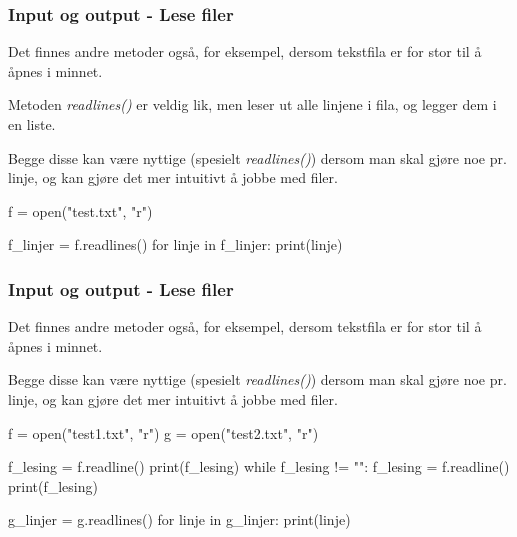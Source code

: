 \begin{frame}[fragile]
    \frametitle{Input og output - Lese filer}

    Det finnes andre metoder også, for eksempel, dersom tekstfila er for stor til å åpnes i minnet. 

    Metoden \textit{readlines()} er veldig lik, men leser ut alle linjene i fila, og legger dem i en liste. 
    
    Begge disse kan være nyttige (spesielt \textit{readlines()}) dersom man skal gjøre noe pr. linje, og kan gjøre det mer intuitivt å jobbe med filer. 

\begin{python}
f = open("test.txt", "r")

f_linjer = f.readlines()
for linje in f_linjer:
    print(linje)
\end{python}

\end{frame}

\begin{frame}[fragile]
    \frametitle{Input og output - Lese filer}

    Det finnes andre metoder også, for eksempel, dersom tekstfila er for stor til å åpnes i minnet. 
    
    Begge disse kan være nyttige (spesielt \textit{readlines()}) dersom man skal gjøre noe pr. linje, og kan gjøre det mer intuitivt å jobbe med filer. 

\begin{python}
f = open("test1.txt", "r")
g = open("test2.txt", "r")

f_lesing = f.readline()
print(f_lesing)
while f_lesing != "":
    f_lesing = f.readline()
    print(f_lesing)

g_linjer = g.readlines()
for linje in g_linjer:
    print(linje)
\end{python}

\end{frame}
